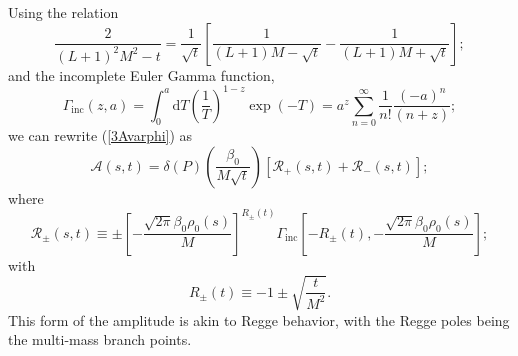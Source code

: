 Using the relation
\begin{equation}
	\frac{2}{(L+1)^{2} M^{2} - t} = \frac{1}{\sqrt{t}} \left[ \frac{1}{(L+1)M - \sqrt{t}} - \frac{1}{(L+1)M + \sqrt{t}} \right];
\end{equation}
and the incomplete Euler Gamma function,
\begin{equation}
	\Gamma_{\text{inc}}(z, a) = \int_{0}^{a} \mathrm{d}T \left( \frac{1}{T} \right)^{1-z} \exp{(-T)} = a^{z} \sum_{n = 0}^{\infty} \frac{1}{n!} \frac{(-a)^{n}}{(n + z)};
\end{equation}
we can rewrite (\ref{3Avarphi}) as
\begin{equation}
	\mathcal{A}(s, t) = \delta(P) \left( \frac{\beta_{0}}{M \sqrt{t}} \right) \left[ \mathcal{R}_{+}(s, t) + \mathcal{R}_{-}(s, t) \right];
\end{equation}
where
\begin{equation}
	\mathcal{R}_{\pm}(s, t) \equiv \pm \left[ - \frac{\sqrt{2 \pi} \beta_{0} \rho_{0}(s)}{M} \right]^{R_{\pm}(t)} \Gamma_{\text{inc}}\left[ -R_{\pm}(t),  - \frac{\sqrt{2 \pi} \beta_{0} \rho_{0}(s)}{M} \right];
	\label{615}
\end{equation}
with
\begin{equation}
	R_{\pm}(t) \equiv -1 \pm \sqrt{\frac{t}{M^{2}}}.
\end{equation}
This form of the amplitude is akin to Regge behavior, with the Regge poles being the multi-mass branch points.
